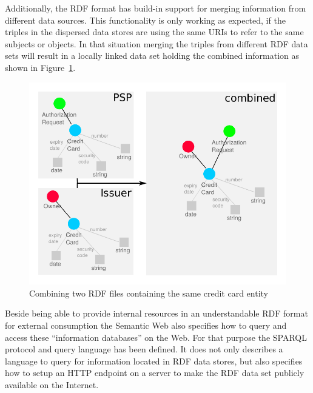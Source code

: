 Additionally, the \gls{RDF} format has build-in support for merging information from different data sources. This functionality is only working as expected, if the triples in the dispersed data stores are using the same \gls{URI}s to refer to the same subjects or objects. In that situation merging the triples from different \gls{RDF} data sets will result in a locally linked data set holding the combined information as shown in Figure~\ref{fig:images_combine_rdf_graph}. \@

\begin{figure}[H]
	\centering
		\includegraphics[width=0.9\columnwidth]{images/combine_rdf_graph.pdf}
	\caption{Combining two \gls{RDF} files containing the same credit card entity}
\label{fig:images_combine_rdf_graph}
\end{figure}

Beside being able to provide internal resources in an understandable \gls{RDF} format for external consumption the Semantic Web also specifies how to query and access these ``information databases'' on the Web. For that purpose the \gls{SPARQL} protocol and query language has been defined. It does not only describes a language to query for information located in \gls{RDF} data stores, but also specifies how to setup an \gls{HTTP} endpoint on a server to make the \gls{RDF} data set publicly available on the Internet. \\

